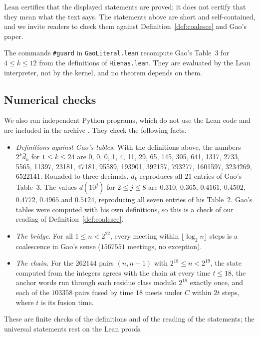 \documentclass[11pt]{amsart}
\theoremstyle{definition}
\theoremstyle{remark}
\newcommand{\dbar}{\bar d}
\newcommand{\lean}[1]{\nolinkurl{#1}}
\begin{document}
Lean certifies that the displayed statements are proved; it does not certify that they mean what the text says. The statements above are short and self-contained, and we invite readers to check them against Definition~\ref{def:coalesce} and Gao's paper.

The commands \texttt{\#guard} in \lean{GaoLiteral.lean} recompute Gao's Table~3 for $4\le k\le 12$ from the definitions of \lean{Hienas.lean}. They are evaluated by the Lean interpreter, not by the kernel, and no theorem depends on them.

\subsection{Numerical checks}
We also ran independent Python programs, which do not use the Lean code and are included in the archive \cite{Artifact}. They check the following facts.
\begin{itemize}
\item \emph{Definitions against Gao's tables.} With the definitions above, the numbers $2^k\dbar_k$ for $1\le k\le 24$ are
0, 0, 0, 1, 4, 11, 29, 65, 145, 305, 641, 1317, 2733, 5565, 11397, 23181, 47181, 95589, 193901, 392157, 793277, 1601597, 3234269, 6522141.
Rounded to three decimals, $\dbar_k$ reproduces all $21$ entries of Gao's Table~3. The values $d(10^j)$ for $2\le j\le 8$ are $0.310$, $0.365$, $0.4161$, $0.4502$, $0.4772$, $0.4965$ and $0.5124$, reproducing all seven entries of his Table~2. Gao's tables were computed with his own definitions, so this is a check of our reading of Definition~\ref{def:coalesce}.
\item \emph{The bridge.} For all $1\le n<2^{22}$, every meeting within $\lfloor\log_2 n\rfloor$ steps is a coalescence in Gao's sense ($1567551$ meetings, no exception).
\item \emph{The chain.} For the $262144$ pairs $(n,n+1)$ with $2^{18}\le n<2^{19}$, the state computed from the integers agrees with the chain at every time $t\le18$, the anchor words run through each residue class modulo $2^{18}$ exactly once, and each of the $103358$ pairs fused by time $18$ meets under $C$ within $2t$ steps, where $t$ is its fusion time.
\end{itemize}
These are finite checks of the definitions and of the reading of the statements; the universal statements rest on the Lean proofs.
\end{document}
